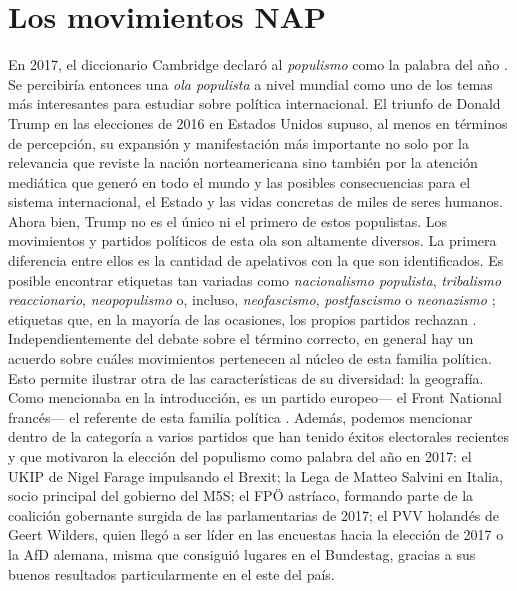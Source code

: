 \chapter{Los movimientos NAP}

En 2017, el diccionario Cambridge declaró al \textit{populismo} como la palabra del año \parencite{MuddeCambridge17}. Se percibiría entonces una \textit{ola populista} a nivel mundial como uno de los temas más interesantes para estudiar sobre política internacional. El triunfo de Donald Trump en las elecciones de 2016 en Estados Unidos supuso, al menos en términos de percepción, su expansión y manifestación más importante no solo por la relevancia que reviste la nación norteamericana sino también por la atención mediática que generó en todo el mundo y las posibles consecuencias para el sistema internacional, el Estado y las vidas concretas de miles de seres humanos.\\

Ahora bien, Trump no es el único ni el primero de estos populistas. Los movimientos y partidos políticos de esta ola son altamente diversos. La primera diferencia entre ellos es la cantidad de apelativos con la que son identificados. Es posible encontrar etiquetas tan variadas como \textit{nacionalismo populista}, \textit{tribalismo reaccionario}, \textit{neopopulismo} o, incluso, \textit{neofascismo}, \textit{postfascismo} o \textit{neonazismo} \parencites{Mudde07a}{Mammone12}{Hainsworth16a}; etiquetas que, en la mayoría de las ocasiones, los propios partidos rechazan \parencites{LeParisien13}{Hainsworth16a}{Sputnik17}.\\ 

Independientemente del debate sobre el término correcto, en general hay un acuerdo sobre cuáles movimientos pertenecen al núcleo de esta familia política. Esto permite ilustrar otra de las características de su diversidad: la geografía. Como mencionaba en la introducción, es un partido europeo--- el Front National francés--- el referente de esta familia política \parencite{Mudde07a}. Además, podemos mencionar dentro de la categoría a varios partidos que han tenido éxitos electorales recientes y que motivaron la elección del populismo como palabra del año en 2017: el UKIP de Nigel Farage impulsando el Brexit; la Lega de Matteo Salvini en Italia, socio principal del gobierno del M5S; el FPÖ astríaco, formando parte de la coalición gobernante surgida de las parlamentarias de 2017; el PVV holandés de Geert Wilders, quien llegó a ser líder en las encuestas hacia la elección de 2017 o la AfD alemana, misma que consiguió lugares en el Bundestag, gracias a sus buenos resultados particularmente en el este del país.\\ 

